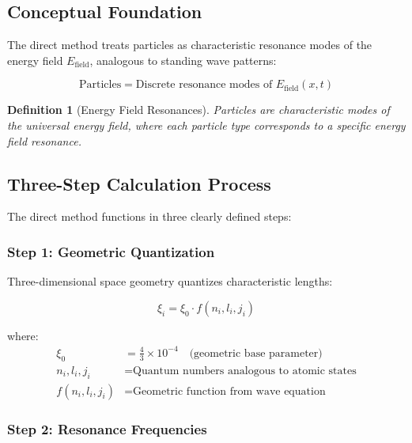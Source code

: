 \documentclass[12pt,a4paper]{article}
\newcommand{\Efield}{E_{\text{field}}}
\newtheorem{definition}[theorem]{Definition}
\begin{document}
	\subsection{Conceptual Foundation}
	\label{subsec:direct_principles}
	
	The direct method treats particles as characteristic resonance modes of the energy field $\Efield$, analogous to standing wave patterns:
	
	\begin{equation}
		\text{Particles} = \text{Discrete resonance modes of } \Efield(x,t)
	\end{equation}
	
	\begin{definition}[Energy Field Resonances]
		Particles are characteristic modes of the universal energy field, where each particle type corresponds to a specific energy field resonance.
	\end{definition}
	
	\subsection{Three-Step Calculation Process}
	\label{subsec:three_step_process}
	
	The direct method functions in three clearly defined steps:
	
	\subsubsection{Step 1: Geometric Quantization}
	\label{subsubsec:step1}
	
	Three-dimensional space geometry quantizes characteristic lengths:
	
	\begin{equation}
		\xi_i = \xi_0 \cdot f(n_i, l_i, j_i)
		\label{eq:geometric_quantization}
	\end{equation}
	
	where:
	\begin{align}
		\xi_0 &= \frac{4}{3} \times 10^{-4} \quad \text{(geometric base parameter)} \\
		n_i, l_i, j_i &= \text{Quantum numbers analogous to atomic states} \\
		f(n_i, l_i, j_i) &= \text{Geometric function from wave equation}
	\end{align}
	
	\subsubsection{Step 2: Resonance Frequencies}
	\label{subsubsec:step2}
	
\end{document}
